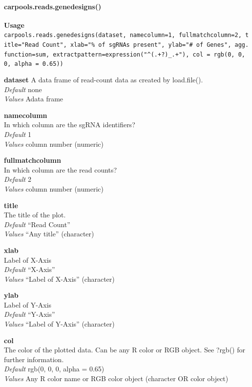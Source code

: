 \documentclass[]{article}
\let\oldparagraph\paragraph
\renewcommand{\paragraph}[1]{\oldparagraph{#1}\mbox{}}
\begin{document}
\paragraph{carpools.reads.genedesigns()}\label{carpools.reads.genedesigns}

\textbf{Usage}\\
\texttt{carpools.reads.genedesigns(dataset,\ namecolumn=1,\ fullmatchcolumn=2,\ title="Read\ Count",\ xlab="\%\ of\ sgRNAs\ present",\ ylab="\#\ of\ Genes",\ agg.function=sum,\ extractpattern=expression("\^{}(.+?)\_.+"),\ col\ =\ rgb(0,\ 0,\ 0,\ alpha\ =\ 0.65))}

\textbf{dataset} A data frame of read-count data as created by
load.file().\\
\emph{Default} none\\
\emph{Values} Adata frame

\textbf{namecolumn}\\
In which column are the sgRNA identifiers?\\
\emph{Default} 1\\
\emph{Values} column number (numeric)

\textbf{fullmatchcolumn}\\
In which column are the read counts?\\
\emph{Default} 2\\
\emph{Values} column number (numeric)

\textbf{title}\\
The title of the plot.\\
\emph{Default} ``Read Count''\\
\emph{Values} ``Any title'' (character)

\textbf{xlab}\\
Label of X-Axis\\
\emph{Default} ``X-Axis''\\
\emph{Values} ``Label of X-Axis'' (character)

\textbf{ylab}\\
Label of Y-Axis\\
\emph{Default} ``Y-Axis''\\
\emph{Values} ``Label of Y-Axis'' (character)

\textbf{col}\\
The color of the plotted data. Can be any R color or RGB object. See
?rgb() for further information.\\
\emph{Default} rgb(0, 0, 0, alpha = 0.65)\\
\emph{Values} Any R color name or RGB color object (character OR color
object)
\end{document}
